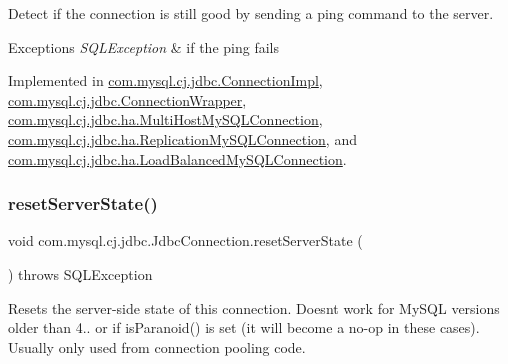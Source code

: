 Detect if the connection is still good by sending a ping command to the server.


\begin{DoxyExceptions}{Exceptions}
{\em S\+Q\+L\+Exception} & if the ping fails \\
\hline
\end{DoxyExceptions}


Implemented in \mbox{\hyperlink{classcom_1_1mysql_1_1cj_1_1jdbc_1_1_connection_impl_a790847769075cca4f1f42d47b864f3e3}{com.\+mysql.\+cj.\+jdbc.\+Connection\+Impl}}, \mbox{\hyperlink{classcom_1_1mysql_1_1cj_1_1jdbc_1_1_connection_wrapper_af9d635c00b09fc14bff63eeeec9b354d}{com.\+mysql.\+cj.\+jdbc.\+Connection\+Wrapper}}, \mbox{\hyperlink{classcom_1_1mysql_1_1cj_1_1jdbc_1_1ha_1_1_multi_host_my_s_q_l_connection_a75f3a66c04a2960e920a6e57a3279556}{com.\+mysql.\+cj.\+jdbc.\+ha.\+Multi\+Host\+My\+S\+Q\+L\+Connection}}, \mbox{\hyperlink{classcom_1_1mysql_1_1cj_1_1jdbc_1_1ha_1_1_replication_my_s_q_l_connection_a87a413280dac1e1f0be1bd8c93420082}{com.\+mysql.\+cj.\+jdbc.\+ha.\+Replication\+My\+S\+Q\+L\+Connection}}, and \mbox{\hyperlink{classcom_1_1mysql_1_1cj_1_1jdbc_1_1ha_1_1_load_balanced_my_s_q_l_connection_a58a06fe0caa8144988fb2464d9fc4b0a}{com.\+mysql.\+cj.\+jdbc.\+ha.\+Load\+Balanced\+My\+S\+Q\+L\+Connection}}.

\mbox{\label{interfacecom_1_1mysql_1_1cj_1_1jdbc_1_1_jdbc_connection_a44456aec7737354a14eff20638c047fa}} 
\subsubsection{\texorpdfstring{reset\+Server\+State()}{resetServerState()}}
{\footnotesize\ttfamily void com.\+mysql.\+cj.\+jdbc.\+Jdbc\+Connection.\+reset\+Server\+State (\begin{DoxyParamCaption}{ }\end{DoxyParamCaption}) throws S\+Q\+L\+Exception}

Resets the server-\/side state of this connection. Doesn\textquotesingle{}t work for My\+S\+QL versions older than 4.. or if is\+Paranoid() is set (it will become a no-\/op in these cases). Usually only used from connection pooling code.


